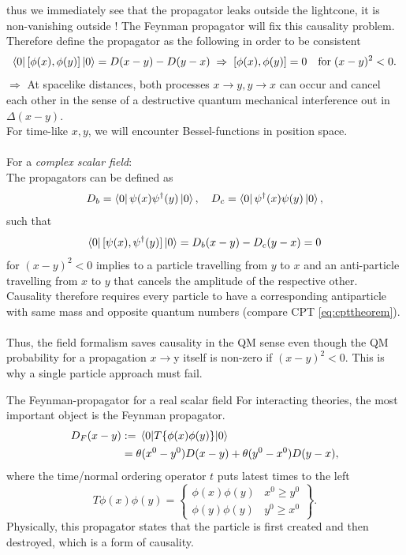 thus we immediately see that the propagator leaks outside the lightcone, it is non-vanishing outside ! The Feynman propagator will fix this causality problem. Therefore define the propagator as the following in order to be consistent
\begin{equation}
\bra{0}	[\phi(x),\phi(y)]\ket{0}=D(x-y) - D(y-x) \; \Rightarrow \; [\phi(x),\phi(y)]=0 \quad \mathrm{for} \; (x-y)^2<0.
\end{equation}
$\Rightarrow$ At  spacelike distances, both processes $x\rightarrow y, y \rightarrow x$ can occur and cancel each other in the sense of a destructive quantum mechanical interference out in $\Delta(x-y)$.\\
For time-like $x,y$, we will encounter Bessel-functions in position space.\\
\\
For a \emph{complex scalar field}:\\
The propagators can be defined as
\begin{equation}
	D_b = \bra{0}\psi(x) \psi^\dagger(y) \ket{0}, \quad D_c= \bra{0}\psi^\dagger(x)\psi(y) \ket{0},
\end{equation}
such that
\begin{equation}
\bra{0}	[\psi(x), \psi^\dagger(y)]\ket{0} = D_b(x-y)-D_c(y-x) =0
\end{equation}
 for $(x-y)^2<0$ implies to a particle travelling from $y$ to $x$ and an anti-particle travelling from $x$ to $y$ that cancels the amplitude of the respective other. Causality therefore requires every particle to have a corresponding antiparticle with same mass and opposite quantum numbers (compare CPT \ref{eq:cpttheorem}).\\
\\
Thus, the field formalism saves causality in the QM sense even though the QM probability for a propagation $x\rightarrow$y itself is non-zero if $(x-y)^2<0$. This is why a single particle approach must fail.\\
\begin{mybox}{The Feynman-propagator for a real scalar field}
	For interacting theories, the most important object is the Feynman propagator.
	\begin{align}
		D_F(x-y) &:= \expval{T \{\phi(x) \phi(y)\} }{0} \\
		&= \theta(x^0-y^0) D(x-y) + \theta(y^0-x^0) D(y-x),\nonumber
	\end{align}
	where the time/normal ordering operator $t$ puts latest times to the left
	\begin{equation}
		T\phi(x)\phi(y) = \left\{ \begin{array}{lr}
		\phi(x) \phi(y) & x^0 \geq y^0\\
		\phi(y)\phi(y) & y^0 \geq x^0
		\end{array}\right\} .
	\end{equation}
	Physically, this propagator states that the particle is first created and then destroyed, which is a form of causality.
\end{mybox}
